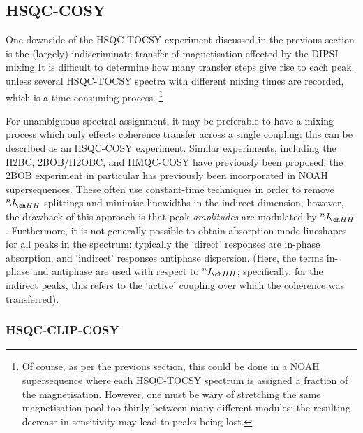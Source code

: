 \subsection{HSQC-COSY}
\label{subsec:noah__hsqccosy}

One downside of the HSQC-TOCSY experiment discussed in the previous section is the (largely) indiscriminate transfer of magnetisation effected by the DIPSI mixing
It is difficult to determine how many transfer steps give rise to each peak, unless several HSQC-TOCSY spectra with different mixing times are recorded, which is a time-consuming process.%
\footnote{Of course, as per the previous section, this could be done in a NOAH supersequence where each HSQC-TOCSY spectrum is assigned a fraction of the  magnetisation. However, one must be wary of stretching the same magnetisation pool too thinly between many different modules: the resulting decrease in sensitivity may lead to peaks being lost.}

For unambiguous spectral assignment, it may be preferable to have a mixing process which only effects coherence transfer across a single coupling: this can be described as an HSQC-COSY experiment.
Similar experiments, including the H2BC\autocite{Nyberg2005JACS,Nyberg2005MRC}, 2BOB/H2OBC\autocite{Kupce2017MRC}, and HMQC-COSY\autocite{Hu2011JBNMR} have previously been proposed: the 2BOB experiment in particular has previously been incorporated in NOAH supersequences\autocite{Kupce2019JMR}.
These often use constant-time techniques in order to remove $\nJ{HH}$ splittings and minimise linewidths in the indirect dimension; however, the drawback of this approach is that peak \textit{amplitudes} are modulated by $\nJ{HH}$.
Furthermore, it is not generally possible to obtain absorption-mode lineshapes for all peaks in the spectrum: typically the `direct' responses are in-phase absorption, and `indirect' responses antiphase dispersion.
(Here, the terms in-phase and antiphase are used with respect to $\nJ{HH}$; specifically, for the indirect peaks, this refers to the `active' coupling over which the coherence was transferred).


\subsubsection{HSQC-CLIP-COSY}

